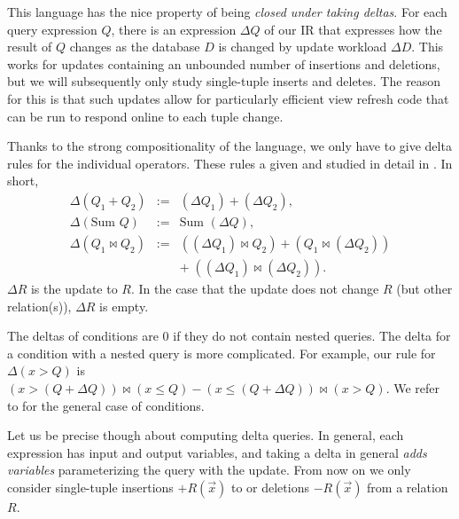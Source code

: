This language has the nice property of being {\em closed under taking deltas}.
For each query expression $Q$, there
is an expression $\Delta Q$ of our IR that expresses how the result of $Q$ changes as the database $D$ is changed by update workload $\Delta D$. This works for updates containing an unbounded number of insertions and deletions, but we will subsequently only study single-tuple inserts and deletes.
The reason for this is that such updates allow for particularly efficient view refresh code that
can be run to respond online to each tuple change.


Thanks to the strong compositionality of the language, we only have to give delta rules for the 
individual operators. These rules a given and studied in detail in \cite{koch-pods:10}. In short,
\begin{eqnarray*}
\Delta(Q_1 + Q_2)    &:=& (\Delta Q_1) + (\Delta Q_2), \\ 
\Delta(\mbox{Sum } Q)   &:=& \mbox{Sum } (\Delta Q), \\
\Delta(Q_1 \bowtie Q_2) &:=& ((\Delta Q_1) \bowtie Q_2) + (Q_1 \bowtie (\Delta Q_2)) \\
&& +\; ((\Delta Q_1) \bowtie (\Delta Q_2)).
\end{eqnarray*}
$\Delta R$ is the update to $R$. In the case that the update does not change $R$ (but other relation(s)),
$\Delta R$ is empty.
 

The deltas of conditions are 0 if they do not contain nested queries. The delta for a condition with a nested query
is more complicated. For example, our rule for $\Delta (x > Q)$ is
$(x > (Q + \Delta Q)) \bowtie (x \le Q) - (x \le (Q + \Delta Q)) \bowtie (x > Q)$.
We refer to \cite{koch-pods:10} for the general case of conditions.

Let us be precise though about computing delta queries. In general, each expression has input and output variables,
and taking a delta in general {\em adds variables} parameterizing the query with the update. From now on we only consider single-tuple insertions $+R(\vec{x})$ to or deletions $-R(\vec{x})$ from a relation $R$.

\def\dxy{\Delta_{+R(x,y)}}


